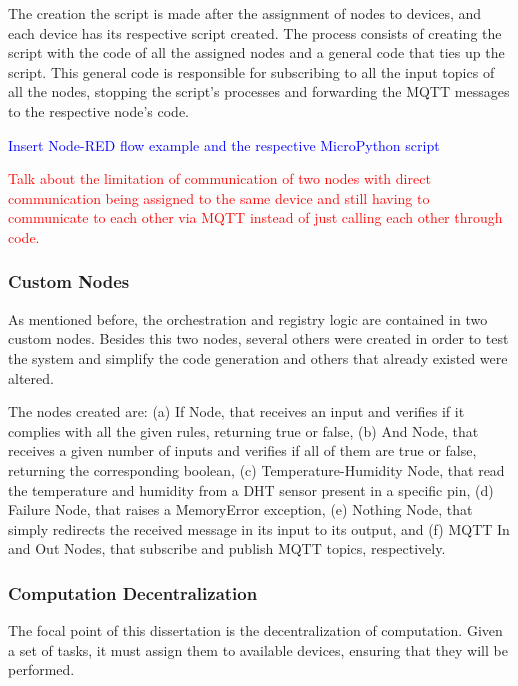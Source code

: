The creation the script is made after the assignment of nodes to devices, and each device has its respective script created. The process consists of creating the script with the code of all the assigned nodes and a general code that ties up the script. This general code is responsible for subscribing to all the input topics of all the nodes, stopping the script's processes and forwarding the MQTT messages to the respective node's code.

\textcolor{blue}{Insert Node-RED flow example and the respective MicroPython script}

\textcolor{red}{Talk about the limitation of communication of two nodes with direct communication being assigned to the same device and still having to communicate to each other via MQTT instead of just calling each other through code.}

\subsubsection{Custom Nodes}\label{sec:custom_nodes}

As mentioned before, the orchestration and registry logic are contained in two custom nodes. Besides this two nodes, several others were created in order to test the system and simplify the code generation and others that already existed were altered. 

The nodes created are: (a) If Node, that receives an input and verifies if it complies with all the given rules, returning true or false, (b) And Node, that receives a given number of inputs and verifies if all of them are true or false, returning the corresponding boolean, (c) Temperature-Humidity Node, that read the temperature and humidity from a DHT sensor present in a specific pin, (d) Failure Node, that raises a MemoryError exception, (e) Nothing Node, that simply redirects the received message in its input to its output, and (f) MQTT In and Out Nodes, that subscribe and publish MQTT topics, respectively.

\subsubsection{Computation Decentralization}\label{sec:node_red_computation_decentralization}

The focal point of this dissertation is the decentralization of computation. Given a set of tasks, it must assign them to available devices, ensuring that they will be performed.

